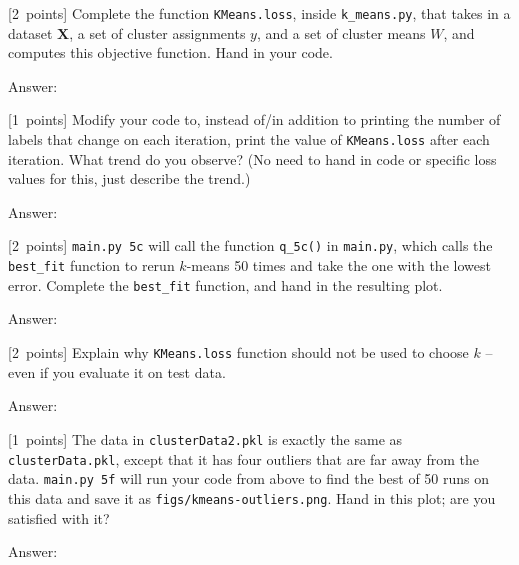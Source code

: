 \documentclass{article}
\newcommand{\ask}[1]{\textcolor{question}{#1}}
\newenvironment{answer}{\par\begingroup\color{answer}Answer: }{\endgroup}
\newcommand{\pts}[1]{\textcolor{points}{[#1~points]}}
\newcommand{\TODO}{\color{red}{TODO}}
\newcommand{\bX}{\mathbf{X}}
\begin{document}
\begin{qlist}
 \item \pts{2} Complete the function \texttt{KMeans.loss}, inside \texttt{k\_means.py}, that takes in a dataset $\bX$, a set of cluster assignments $y$, and a set of cluster means $W$, and computes this objective function. \ask{Hand in your code.}
\begin{answer}\TODO\end{answer}


 \item \pts{1} Modify your code to, instead of/in addition to printing the number of labels that change on each iteration, print the value of \texttt{KMeans.loss} after each iteration. \ask{What trend do you observe?} (No need to hand in code or specific loss values for this, just describe the trend.)
\begin{answer}\TODO\end{answer}

 \item \pts{2} \texttt{main.py 5c} will call the function \verb|q_5c()| in \texttt{main.py}, which calls the \verb|best_fit| function to rerun $k$-means 50 times and take the one with the lowest error. Complete the \verb|best_fit| function, and \ask{hand in the resulting plot}.
\begin{answer}\TODO\end{answer}

 \item \pts{2} \ask{Explain why} \texttt{KMeans.loss} function should not be used to choose $k$ -- even if you evaluate it on test data.
\begin{answer}\TODO\end{answer}


 \item \pts{1} The data in \texttt{clusterData2.pkl} is exactly the same as \texttt{clusterData.pkl}, except that it has four outliers that are far away from the data. \texttt{main.py 5f} will run your code from above to find the best of 50 runs on this data and save it as \texttt{figs/kmeans-outliers.png}. \ask{Hand in this plot; are you satisfied with it?}
 \begin{answer}\TODO\end{answer}


\end{qlist}
\end{document}
